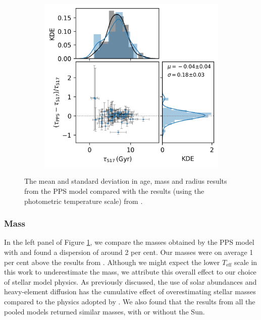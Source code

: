 \documentclass[a4paper,fleqn,usenatbib]{mnras}
\newcommand{\teff}{\ensuremath{T_\mathrm{eff}}}
\begin{document}
\begin{figure}
\begin{subfigure}[b]{.33\linewidth}
    \end{subfigure}%
    \begin{subfigure}[b]{.33\linewidth}
        \includegraphics[width=\linewidth]{figures/age_comp.png}
    \end{subfigure}%
    \caption{The mean and standard deviation in age, mass and radius results from the PPS model compared with the results (using the photometric temperature scale) from .}
    \label{fig:comp}
\end{figure}

\subsubsection{Mass}

In the left panel of Figure \ref{fig:comp}, we compare the masses obtained by the PPS model with  and found a dispersion of around 2 per cent. Our masses were on average 1 per cent above the results from . Although we might expect the lower $\teff$ scale in this work to underestimate the mass, we attribute this overall effect to our choice of stellar model physics. As previously discussed, the use of \citet{Asplund.Grevesse.ea2009} solar abundances and heavy-element diffusion has the cumulative effect of overestimating stellar masses compared to the physics adopted by . We also found that the results from all the pooled models returned similar masses, with or without the Sun.
\end{document}
